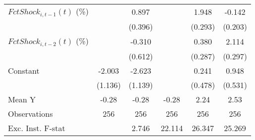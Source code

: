 {\begin{tabular}{l*{5}{c}}
\addlinespace
$ FctShock_{i,t-1}(t)$ (\%)&                     &       0.897\sym{**} &                     &       1.948\sym{***}&      -0.142         \\
                    &                     &     (0.396)         &                     &     (0.293)         &     (0.203)         \\
\addlinespace
$ FctShock_{i,t-2}(t)$ (\%)&                     &      -0.310         &                     &       0.380         &       2.114\sym{***}\\
                    &                     &     (0.612)         &                     &     (0.287)         &     (0.297)         \\
\addlinespace
Constant            &      -2.003         &      -2.623\sym{**} &                     &       0.241         &       0.948\sym{*}  \\
                    &     (1.136)         &     (1.139)         &                     &     (0.478)         &     (0.531)         \\
\midrule
Mean Y              &       -0.28         &       -0.28         &       -0.28         &        2.24         &        2.53         \\
Observations        &         256         &         256         &         256         &         256         &         256         \\
Exc. Inst. F-stat   &                     &       2.746         &      22.114         &      26.347         &      25.269         \\
\bottomrule
\end{tabular}
}
